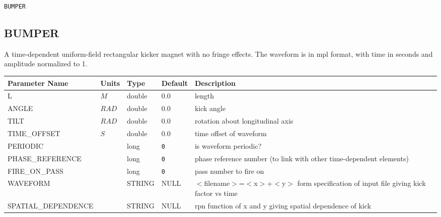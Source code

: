 \begin{latexonly}
\newpage
\begin{center}{\Large\verb|BUMPER|}\end{center}
\end{latexonly}\subsection{BUMPER}
A time-dependent uniform-field rectangular kicker magnet with no fringe effects.
The waveform is in mpl format, with time in seconds and amplitude normalized to 1.
\\
\begin{tabular}{|l|l|l|l|p{\descwidth}|} \hline
Parameter Name & Units & Type & Default & Description \\ \hline 
L & $M$ & double &  0.0 & length  \\ \hline 
ANGLE & $RAD$ & double &  0.0 & kick angle  \\ \hline 
TILT & $RAD$ & double &  0.0 & rotation about longitudinal axis  \\ \hline 
TIME\_OFFSET & $S$ & double &  0.0 & time offset of waveform  \\ \hline 
PERIODIC &  & long &  \verb|0| & is waveform periodic?  \\ \hline 
PHASE\_REFERENCE &  & long &  \verb|0| & phase reference number (to link with other time-dependent elements)  \\ \hline 
FIRE\_ON\_PASS &  & long &  \verb|0| & pass number to fire on  \\ \hline 
WAVEFORM &  & STRING &   NULL            & $<$filename$>$=$<$x$>$+$<$y$>$ form specification of input file giving kick factor vs time  \\ \hline 
SPATIAL\_DEPENDENCE &  & STRING &   NULL            & rpn function of x and y giving spatial dependence of kick  \\ \hline 
\end{tabular}

